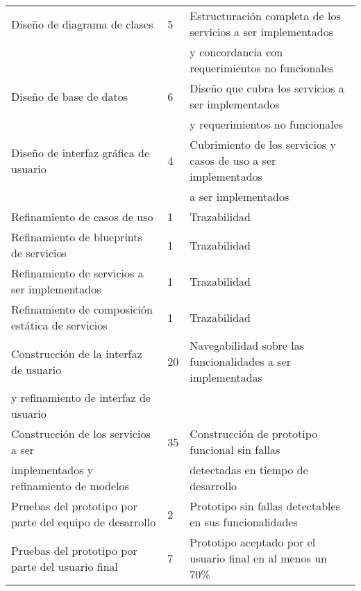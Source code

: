 \begin{table}[h]
\begin{center}
{\begin{tabular}{|l|l|l|}
        Diseño de diagrama de clases & 5 & Estructuración completa de los servicios a ser implementados \\ 
        
         &  & y concordancia con requerimientos no funcionales \\ 
        
        Diseño de base de datos & 6 & Diseño que cubra los servicios a ser implementados \\ 
        
         &  &  y requerimientos no funcionales \\ 
        
        Diseño de interfaz gráfica de usuario & 4 & Cubrimiento de los servicios y casos de uso a ser implementados \\ 
        
         &  &  a ser implementados \\ 
        
        Refinamiento de casos de uso & 1 & Trazabilidad \\ 
        
        Refinamiento de blueprints de servicios & 1 & Trazabilidad \\ 
        
        Refinamiento de servicios a ser implementados & 1 & Trazabilidad \\ 
        
        Refinamiento de composición estática de servicios & 1 & Trazabilidad \\ 
        
        Construcción de la interfaz de usuario & 20 & Navegabilidad sobre las funcionalidades a ser implementadas \\ 
        
        y refinamiento de interfaz de usuario &  &  \\ 
        
        Construcción de los servicios a ser  & 35 & Construcción de prototipo funcional sin fallas \\ 
        
        implementados y refinamiento de modelos &  & detectadas en tiempo de desarrollo \\ 
        
        Pruebas del prototipo por parte del equipo de desarrollo & 2 & Prototipo sin fallas detectables en sus funcionalidades \\ 
        
        Pruebas del prototipo por parte del usuario final & 7 & Prototipo aceptado por el usuario final en al menos un 70\% \\
        \hline

        \end{tabular}
    }
  \end{center}
\end{table}
